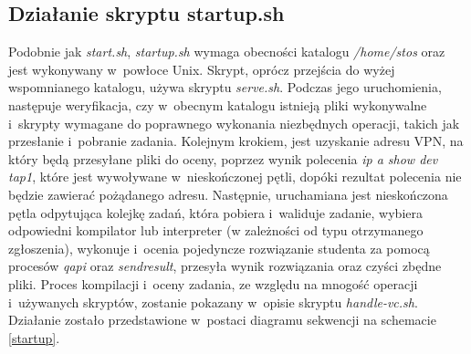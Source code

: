 \subsection{Działanie skryptu startup.sh}
Podobnie jak \textit{start.sh}, \textit{startup.sh} wymaga obecności katalogu \textit{/home/stos} oraz jest wykonywany w~powłoce Unix. Skrypt, oprócz przejścia do wyżej wspomnianego katalogu, używa skryptu \textit{serve.sh}. Podczas jego uruchomienia, następuje weryfikacja, czy w~obecnym katalogu istnieją pliki wykonywalne i~skrypty wymagane do poprawnego wykonania niezbędnych operacji, takich jak przesłanie i~pobranie zadania. Kolejnym krokiem, jest uzyskanie adresu VPN, na który będą przesyłane pliki do oceny, poprzez wynik polecenia \textit{ip a show dev tap1}\cite{ip_addr}, które jest wywoływane w~nieskończonej pętli, dopóki rezultat polecenia nie będzie zawierać pożądanego adresu. Następnie, uruchamiana jest nieskończona pętla odpytująca kolejkę zadań, która pobiera i~waliduje zadanie, wybiera odpowiedni kompilator lub interpreter (w zależności od typu otrzymanego zgłoszenia), wykonuje i~ocenia pojedyncze rozwiązanie studenta za pomocą procesów \textit{qapi} oraz \textit{sendresult}, przesyła wynik rozwiązania oraz czyści zbędne pliki. Proces kompilacji i~oceny zadania, ze względu na mnogość operacji i~używanych skryptów, zostanie pokazany w~opisie skryptu \textit{handle-vc.sh}. Działanie zostało przedstawione w~postaci diagramu sekwencji na schemacie \ref{startup}.
